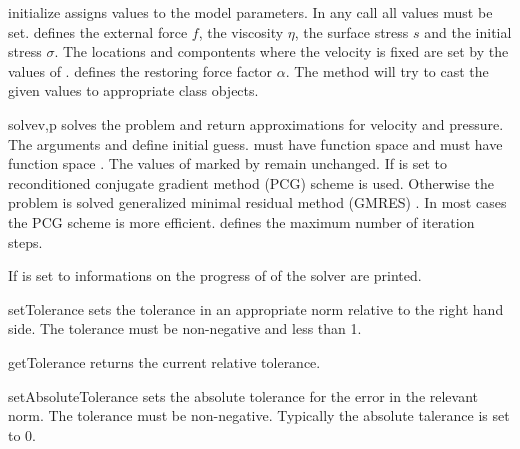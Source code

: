 \begin{methoddesc}[StokesProblemCartesian]{initialize}{}
assigns values to the model parameters. In any call all values must be set.
 defines the external force $f$,  the viscosity $\eta$,
 the surface stress $s$ and  the initial stress $\sigma$.
The locations and compontents where the velocity is fixed are set by 
the values of .  defines the restoring force factor $\alpha$. 
The method will try to cast the given values to appropriate 
\Data class objects.
\end{methoddesc}

\begin{methoddesc}[StokesProblemCartesian]{solve}{v,p
}
solves the problem and return approximations for velocity and pressure. 
The arguments  and  define initial guess.
 must have function space  and
 must have function space .
The values of  marked
by  remain unchanged. 
If  is set to \True 
reconditioned conjugate gradient method (PCG)   scheme is used. Otherwise the problem is solved generalized minimal residual method (GMRES) . In most cases 
the PCG scheme is more efficient.
 defines the maximum number of iteration steps. 

If  is set to \True informations on the progress of of the solver are printed.
\end{methoddesc}


\begin{methoddesc}[StokesProblemCartesian]{setTolerance}{}
sets the tolerance in an appropriate norm relative to the right hand side. The tolerance must be non-negative and less than 1.
\end{methoddesc}
\begin{methoddesc}[StokesProblemCartesian]{getTolerance}{}
returns the current relative tolerance.
\end{methoddesc}
\begin{methoddesc}[StokesProblemCartesian]{setAbsoluteTolerance}{}
sets the absolute tolerance for the error in the relevant norm. The tolerance must be non-negative. Typically the
absolute talerance is set to 0.
\end{methoddesc}

